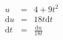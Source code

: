\documentclass[11pt]{exam}
\begin{document}
\begin{minipage}{.5\linewidth}
	\begin{eqnarray*}
	  	u &=& 4 + 9t^2\\
  		\mathrm{d}u &=& 18t \mathrm{d}t\\
  		\mathrm{d}t &=& \frac{\mathrm{d}u}{18t}\\\\\\\\\\\\\\\\\\\\\\
	\end{eqnarray*}
\end{minipage}
\end{document}
